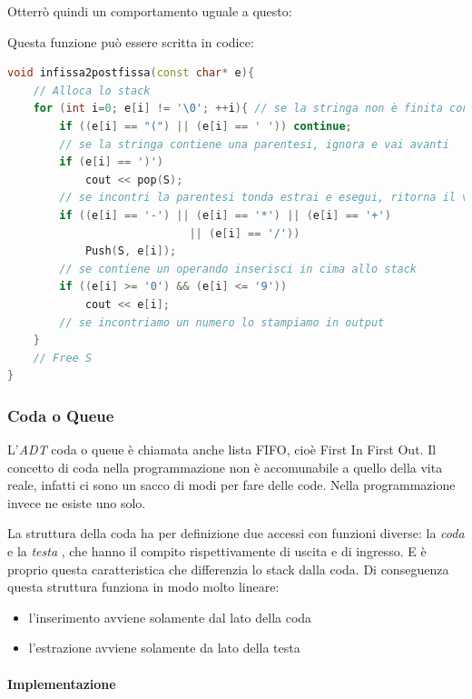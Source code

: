 \documentclass[
  paper=a4,
  oneside  ,captions=tableheading
]{scrbook}
\providecommand{\tightlist}{%
  \setlength{\itemsep}{0pt}\setlength{\parskip}{0pt}}
\begin{document}
Otterrò quindi un comportamento uguale a questo:

Questa funzione può essere scritta in codice:

\begin{lstlisting}[language={C++}]
void infissa2postfissa(const char* e){
    // Alloca lo stack
    for (int i=0; e[i] != '\0'; ++i){ // se la stringa non è finita continua
        if ((e[i] == "(") || (e[i] == ' ')) continue;
        // se la stringa contiene una parentesi, ignora e vai avanti
        if (e[i] == ')')
            cout << pop(S);
        // se incontri la parentesi tonda estrai e esegui, ritorna il valore finale
        if ((e[i] == '-') || (e[i] == '*') || (e[i] == '+')
                            || (e[i] == '/'))
            Push(S, e[i]);
        // se contiene un operando inserisci in cima allo stack
        if ((e[i] >= '0') && (e[i] <= '9'))
            cout << e[i];
        // se incontriamo un numero lo stampiamo in output
    }
    // Free S
}
\end{lstlisting}

\hypertarget{coda-o-queue}{%
\subsubsection{Coda o Queue}\label{coda-o-queue}}

L'\emph{ADT} coda o queue è chiamata anche lista FIFO, cioè First In
First Out. Il concetto di coda nella programmazione non è accomunabile a
quello della vita reale, infatti ci sono un sacco di modi per fare delle
code. Nella programmazione invece ne esiste uno solo.

La struttura della coda ha per definizione due accessi con funzioni
diverse: la \emph{coda} e la \emph{testa} , che hanno il compito
rispettivamente di uscita e di ingresso. E è proprio questa
caratteristica che differenzia lo stack dalla coda. Di conseguenza
questa struttura funziona in modo molto lineare:

\begin{itemize}
\tightlist
\item
  l'inserimento avviene solamente dal lato della coda
\item
  l'estrazione avviene solamente da lato della testa
\end{itemize}

\hypertarget{implementazione-2}{%
\paragraph{Implementazione}\label{implementazione-2}}
\end{document}
